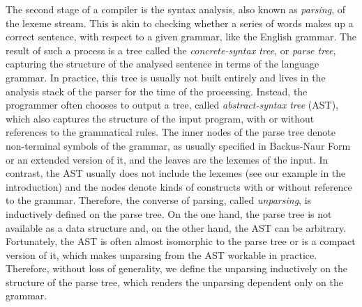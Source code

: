 The second stage of a compiler is the syntax analysis, also known as
\emph{parsing}, of the lexeme stream. This is akin to checking whether
a series of words makes up a correct sentence, with respect to a given
grammar, like the English grammar. The result of such a process is a
tree called the \emph{concrete\hyp{}syntax tree}, or \emph{parse
  tree}, capturing the structure of the analysed sentence in terms of
the language grammar. In practice, this tree is usually not built
entirely and lives in the analysis stack of the parser for the time of
the processing. Instead, the programmer often chooses to output a
tree, called \emph{abstract\hyp{}syntax tree} (AST), which also
captures the structure of the input program, with or without
references to the grammatical rules. The inner nodes of the parse tree
denote non\hyp{}terminal symbols of the grammar, as usually specified
in Backus\hyp{}Naur Form or an extended version of it, and the leaves
are the lexemes of the input. In contrast, the AST usually does not
include the lexemes (see our example in the introduction) and the
nodes denote kinds of constructs with or without reference to the
grammar. Therefore, the converse of parsing, called \emph{unparsing},
is inductively defined on the parse tree. On the one hand, the parse
tree is not available as a data structure and, on the other hand, the
AST can be arbitrary. Fortunately, the AST is often almost isomorphic
to the parse tree or is a compact version of it, which makes unparsing
from the AST workable in practice. Therefore, without loss of
generality, we define the unparsing inductively on the structure of
the parse tree, which renders the unparsing dependent only on the
grammar.

